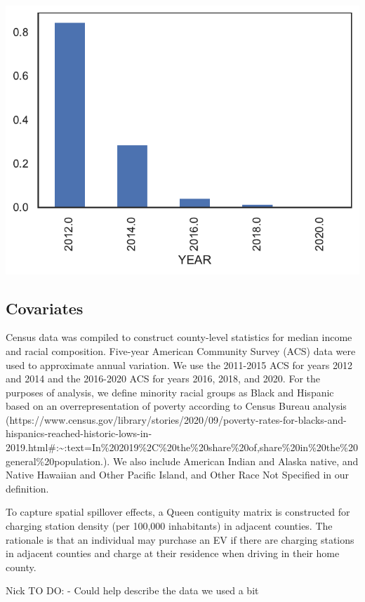 \documentclass[
  letterpaper,
  DIV=11,
  numbers=noendperiod]{scrartcl}
\begin{document}
\includegraphics{TRB_2023_files/figure-pdf/cell-9-output-1.pdf}

\hypertarget{covariates}{%
\subsection{Covariates}\label{covariates}}

Census data was compiled to construct county-level statistics for median
income and racial composition. Five-year American Community Survey (ACS)
data were used to approximate annual variation. We use the 2011-2015 ACS
for years 2012 and 2014 and the 2016-2020 ACS for years 2016, 2018, and
2020. For the purposes of analysis, we define minority racial groups as
Black and Hispanic based on an overrepresentation of poverty according
to Census Bureau analysis
(https://www.census.gov/library/stories/2020/09/poverty-rates-for-blacks-and-hispanics-reached-historic-lows-in-2019.html\#:\textasciitilde:text=In\%202019\%2C\%20the\%20share\%20of,share\%20in\%20the\%20general\%20population.).
We also include American Indian and Alaska native, and Native Hawaiian
and Other Pacific Island, and Other Race Not Specified in our
definition.

To capture spatial spillover effects, a Queen contiguity matrix is
constructed for charging station density (per 100,000 inhabitants) in
adjacent counties. The rationale is that an individual may purchase an
EV if there are charging stations in adjacent counties and charge at
their residence when driving in their home county.

Nick TO DO: - Could help describe the data we used a bit
\end{document}
